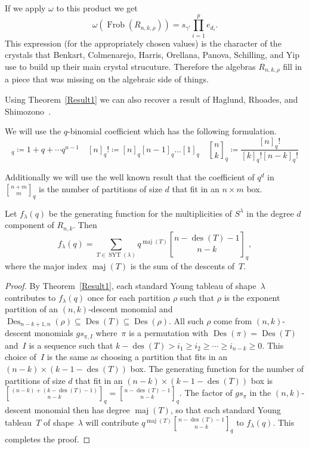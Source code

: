\documentclass[ALCO,ThmDefs,Unicode,epreuves]{cedram}
\DeclareMathOperator{\Frob}{Frob}
\DeclareMathOperator{\Des}{Des}
\DeclareMathOperator{\des}{des}
\DeclareMathOperator{\maj}{maj}
\DeclareMathOperator{\SYT}{SYT}
\begin{document}
If we apply $\omega$ to this product we get 
\begin{equation}
\omega(\Frob (R_{n,k,\rho}))=s_{\gamma'} \prod_{i=1}^p 
e_{d_i}.
\end{equation}
 This expression (for the appropriately chosen values) is the character of the crystals that Benkart, 
Colmenarejo, Harris, Orellana, Panova, Schilling, and Yip~\cite{Sh} use to build up their main crystal strucuture. Therefore 
the algebras $R_{n,k,\rho}$ fill in a piece that was missing on the algebraic side of things.



Using Theorem~\ref{Result1} we can also recover a result of Haglund, Rhoades, and Shimozono~\cite{HRS}.

We will use the $q$-binomial coefficient which has the following formulation.
\begin{equation}
[n]_q\coloneqq 1+q+\cdots q^{n-1}\quad [n]_q!\coloneqq [n]_q[n-1]_q\ldots [1]_q\quad 
\genfrac{[}{]}{0pt}{}{n}{k}_q\coloneqq \frac{[n]_q!}{[k]_q![n-k]_q!}
\end{equation}

Additionally we will use the well known result that the coefficient of $q^d$ in $\genfrac{[}{]}{0pt}{}{n+m}{m}_q$ is the number 
of partitions of size $d$ that fit in an $n\times m$ box.


\begin{coro}
	Let $f_\lambda(q)$ be the generating function for the multiplicities of $S^{\lambda}$ in the degree $d$ component of 
$R_{n,k}$. Then
\begin{equation}
f_\lambda(q)=\sum_{T\in \SYT (\lambda)} 
q^{\maj(T)}\genfrac{[}{]}{0pt}{}{n-\des (T)-1}{n-k}_q,
\end{equation}
 where the major index $\maj(T)$ is the sum of the descents 
of~$T$.
	\begin{proof}

		By Theorem~\ref{Result1}, each standard Young tableau of shape~$\lambda$ contributes to $f_\lambda(q)$ once for each 
partition $\rho$ such that $\rho$ is the exponent partition of an $(n,k)$-descent monomial and 
$\Des _{n-k+1,n}(\rho)\subseteq \Des (T)\subseteq \Des (\rho)$. All such $\rho$ come from $(n,k)$-descent monomials 
$gs_{\pi,I}$ where~$\pi$ is a permutation with $\Des (\pi)=\Des (T)$ and~$I$ is a sequence such that $k-\des (T)>i_1\geq 
i_2\geq\cdots\geq i_{n-k}\geq 0$. This choice of~$I$ is the same as choosing a partition that fits in an $(n-k)\times 
(k-1-\des (T))$ box. The generating function for the number of partitions of size $d$ that fit in an $(n-k)\times 
(k-1-\des (T))$ box is $\genfrac{[}{]}{0pt}{}{(n-k)+(k-\des (T)-1)}{n-k}_q=\genfrac{[}{]}{0pt}{}{n-\des (T)-1}{n-k}_q$. The 
factor of $gs_\pi$ in the $(n,k)$-descent monomial then has degree $\maj(T)$, so that each standard Young tableau~$T$ 
of shape~$\lambda$ will contribute $q^{\maj(T)}\genfrac{[}{]}{0pt}{}{n-\des (T)-1}{n-k}_q$ to $f_\lambda(q)$. This 
completes the proof.
	\end{proof}
\end{coro}
\end{document}

